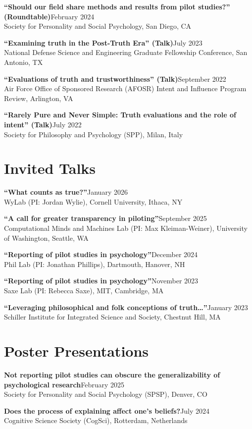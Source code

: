 \documentclass[11pt, letterpaper]{article}
\newcommand{\cventry}[3]{%
    \textbf{#1}\hfill #2\\
    {\color{mutedgray}#3}\par\vspace{0.3em}%
}
\begin{document}
\cventry{``Should our field share methods and results from pilot studies?'' (Roundtable)}{February 2024}
    {Society for Personality and Social Psychology, San Diego, CA}

\cventry{``Examining truth in the Post-Truth Era'' (Talk)}{July 2023}
    {National Defense Science and Engineering Graduate Fellowship Conference, San Antonio, TX}

\cventry{``Evaluations of truth and trustworthiness'' (Talk)}{September 2022}
    {Air Force Office of Sponsored Research (AFOSR) Intent and Influence Program Review, Arlington, VA}

\cventry{``Rarely Pure and Never Simple: Truth evaluations and the role of intent'' (Talk)}{July 2022}
    {Society for Philosophy and Psychology (SPP), Milan, Italy}

\section{Invited Talks}

\cventry{``What counts as true?''}{January 2026}
    {WyLab (PI: Jordan Wylie), Cornell University, Ithaca, NY}

\cventry{``A call for greater transparency in piloting''}{September 2025}
    {Computational Minds and Machines Lab (PI: Max Kleiman-Weiner), University of Washington, Seattle, WA}

\cventry{``Reporting of pilot studies in psychology''}{December 2024}
    {Phil Lab (PI: Jonathan Phillips), Dartmouth, Hanover, NH}

\cventry{``Reporting of pilot studies in psychology''}{November 2023}
    {Saxe Lab (PI: Rebecca Saxe), MIT, Cambridge, MA}

\cventry{``Leveraging philosophical and folk conceptions of truth\ldots''}{January 2023}
    {Schiller Institute for Integrated Science and Society, Chestnut Hill, MA}

\section{Poster Presentations}

\cventry{Not reporting pilot studies can obscure the generalizability of psychological research}{February 2025}
    {Society for Personality and Social Psychology (SPSP), Denver, CO}

\cventry{Does the process of explaining affect one's beliefs?}{July 2024}
    {Cognitive Science Society (CogSci), Rotterdam, Netherlands}
\end{document}
